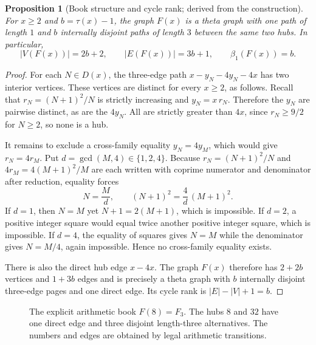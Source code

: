 \documentclass[11pt,a4paper]{article}
\newtheorem{proposition}[theorem]{Proposition}
\theoremstyle{definition}\newtheorem{definition}[theorem]{Definition}
\begin{document}
\begin{proposition}[Book structure and cycle rank; derived from the construction]\label{prop:bookrank}
For $x\ge2$ and $b=\tau(x)-1$, the graph $F(x)$ is a theta graph with one path of length $1$ and $b$ internally disjoint paths of length $3$ between the same two hubs. In particular,
\begin{equation}\label{eq:bookcount}
|V(F(x))|=2b+2,\qquad |E(F(x))|=3b+1,\qquad
\beta_1(F(x))=b.
\end{equation}
\end{proposition}
\begin{proof}
For each $N\in D(x)$, the three-edge path $x-y_N-4y_N-4x$ has two interior vertices. These vertices are distinct for every $x\ge2$, as follows. Recall that $r_N=(N+1)^2/N$ is strictly increasing and $y_N=x\,r_N$. Therefore the $y_N$ are pairwise distinct, as are the $4y_N$. All are strictly greater than $4x$, since $r_N\ge 9/2$ for $N\ge2$, so none is a hub.

It remains to exclude a cross-family equality $y_N=4y_M$, which would give $r_N=4r_M$. Put $d=\gcd(M,4)\in\{1,2,4\}$. Because $r_N=(N+1)^2/N$ and $4r_M=4(M+1)^2/M$ are each written with coprime numerator and denominator after reduction, equality forces
\[
N=\frac{M}{d},\qquad (N+1)^2=\frac4d\,(M+1)^2 .
\]
If $d=1$, then $N=M$ yet $N+1=2(M+1)$, which is impossible. If $d=2$, a positive integer square would equal twice another positive integer square, which is impossible. If $d=4$, the equality of squares gives $N=M$ while the denominator gives $N=M/4$, again impossible. Hence no cross-family equality exists.

There is also the direct hub edge $x-4x$. The graph $F(x)$ therefore has $2+2b$ vertices and $1+3b$ edges and is precisely a theta graph with $b$ internally disjoint three-edge pages and one direct edge. Its cycle rank is $|E|-|V|+1=b$.
\end{proof}

\begin{figure}[htbp]
\centering
{}
\caption{The explicit arithmetic book $F(8)=F_3$. The hubs $8$ and $32$ have one direct edge and three disjoint length-three alternatives. The numbers and edges are obtained by legal arithmetic transitions.}
\label{fig:book}
\end{figure}
\end{document}
